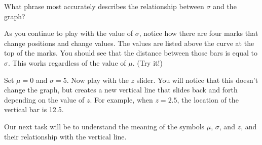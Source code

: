 \documentclass{ximera}
\begin{document}
\begin{question}
What phrase most accurately describes the relationship between $\sigma$ and the graph?

    \begin{multipleChoice}
    \end{multipleChoice}

\end{question}

As you continue to play with the value of $\sigma$, notice how there are four marks that change positions and change values. The values are listed above the curve at the top of the marks. You should see that the distance between those bars is equal to $\sigma$. This works regardless of the value of $\mu$. (Try it!)

Set $\mu = 0$ and $\sigma = 5$. Now play with the $z$ slider. You will notice that this doesn't change the graph, but creates a new vertical line that slides back and forth depending on the value of $z$. For example, when $z = 2.5$, the location of the vertical bar is 12.5.

Our next task will be to understand the meaning of the symbols $\mu$, $\sigma$, and $z$, and their relationship with the vertical line.
\end{document}
